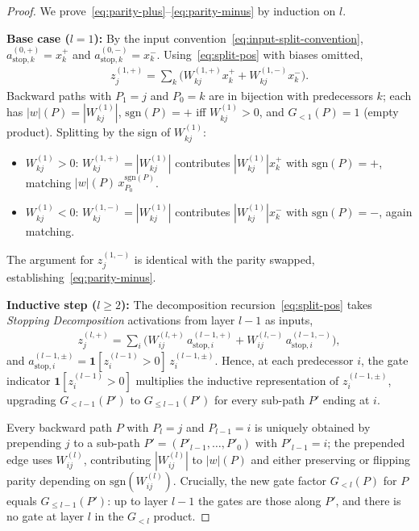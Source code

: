\documentclass[twoside]{article}
\newcommand{\1}{\mathbf{1}}
\begin{document}
\begin{proof}
We prove~\eqref{eq:parity-plus}--\eqref{eq:parity-minus} by induction on $l$.

\textbf{Base case ($l=1$):} By the input convention~\eqref{eq:input-split-convention},
$a_{\mathrm{stop},k}^{(0,+)} = x_k^+$ and $a_{\mathrm{stop},k}^{(0,-)} = x_k^-$.
Using~\eqref{eq:split-pos} with biases omitted,
\begin{align}
    z_j^{(1,+)}
    = \sum_k \bigl( W_{kj}^{(1,+)} x_k^+ + W_{kj}^{(1,-)} x_k^- \bigr).
\end{align}
Backward paths with $P_1 = j$ and $P_0 = k$ are in bijection with predecessors $k$; each has
$|w|(P) = |W^{(1)}_{kj}|$, $\mathrm{sgn}(P) = +$ iff $W^{(1)}_{kj} > 0$, and $G_{<1}(P) = 1$ (empty
product). Splitting by the sign of $W^{(1)}_{kj}$:
\begin{itemize}
    \item $W^{(1)}_{kj} > 0$: $W_{kj}^{(1,+)} = |W^{(1)}_{kj}|$ contributes $|W^{(1)}_{kj}| x_k^+$ with
        $\mathrm{sgn}(P) = +$, matching $|w|(P)\, x_{P_0}^{\mathrm{sgn}(P)}$.
    \item $W^{(1)}_{kj} < 0$: $W_{kj}^{(1,-)} = |W^{(1)}_{kj}|$ contributes $|W^{(1)}_{kj}| x_k^-$ with
        $\mathrm{sgn}(P) = -$, again matching.
\end{itemize}
The argument for $z_j^{(1,-)}$ is identical with the parity swapped,
establishing~\eqref{eq:parity-minus}.

\textbf{Inductive step ($l \ge 2$):} The decomposition recursion~\eqref{eq:split-pos} takes
\emph{Stopping Decomposition} activations from layer $l-1$ as inputs,
\begin{align}
    z_j^{(l,+)}
    =
    \sum_i \bigl(
    W_{ij}^{(l,+)}\, a_{\mathrm{stop},i}^{(l-1,+)}
    + W_{ij}^{(l,-)}\, a_{\mathrm{stop},i}^{(l-1,-)}
    \bigr),
\end{align}
and $a_{\mathrm{stop},i}^{(l-1,\pm)} = \1[z_i^{(l-1)} > 0]\, z_i^{(l-1,\pm)}$. Hence, at each
predecessor $i$, the gate indicator $\1[z_i^{(l-1)} > 0]$ multiplies the inductive representation
of $z_i^{(l-1,\pm)}$, upgrading $G_{<l-1}(P')$ to $G_{\le l-1}(P')$ for every sub-path $P'$ ending
at $i$.

Every backward path $P$ with $P_l = j$ and $P_{l-1} = i$ is uniquely obtained by prepending $j$ to
a sub-path $P' = (P'_{l-1}, \dots, P'_0)$ with $P'_{l-1} = i$; the prepended edge uses
$W^{(l)}_{ij}$, contributing $|W^{(l)}_{ij}|$ to $|w|(P)$ and either preserving or flipping parity
depending on $\mathrm{sgn}(W^{(l)}_{ij})$. Crucially, the new gate factor $G_{<l}(P)$ for $P$
equals $G_{\le l-1}(P')$: up to layer $l-1$ the gates are those along $P'$, and there is no gate at
layer $l$ in the $G_{<l}$ product.


\end{proof}
\end{document}

